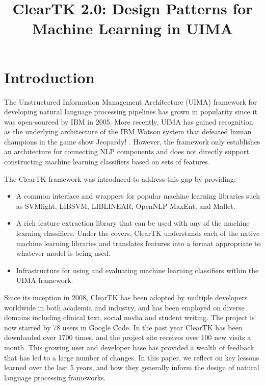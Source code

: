 \documentclass[10pt, a4paper]{article}
\title{ClearTK 2.0: Design Patterns for Machine Learning in UIMA}
\begin{document}
\maketitleabstract

\section{Introduction}
The Unstructured Information Management Architecture (UIMA) framework for developing natural language processing pipelines has grown in popularity since it was open-sourced by IBM in 2005.  More recently, UIMA has gained recognition as the underlying architecture of the IBM Watson system that defeated human champions in the game show Jeopardy! \cite{ferrucci_building_2010}.
However, the framework only establishes an architecture for connecting NLP components and does not directly support constructing machine learning classifiers based on sets of features.

The ClearTK framework was introduced to address this gap \cite{ogren-etal:2008:UIMA-LREC,ogren-etal:2009:UIMA-GSCL} by providing:
\begin{itemize}
\item A common interface and wrappers for popular machine learning libraries such as SVMlight, LIBSVM, LIBLINEAR, OpenNLP MaxEnt, and Mallet.
\item A rich feature extraction library that can be used with any of the machine learning classifiers. Under the covers, ClearTK understands each of the native machine learning libraries and translates features into a format appropriate to whatever model is being used.
\item Infrastructure for using and evaluating machine learning classifiers within the UIMA framework.
\end{itemize}

Since its inception in 2008, ClearTK has been adopted by multiple developers worldwide in both academia and industry, and has been employed on diverse domains including clinical text, social media and student writing.  The project is now starred by 78 users in Google Code.  In the past year ClearTK has been downloaded over 1700 times, and the project site receives over 100 new visits a month.  This growing user and developer base has provided a wealth of feedback that has led to a large number of changes.  In this paper, we reflect on key lessons learned over the last 5 years, and how they generally inform the design of natural language processing frameworks.
\end{document}
